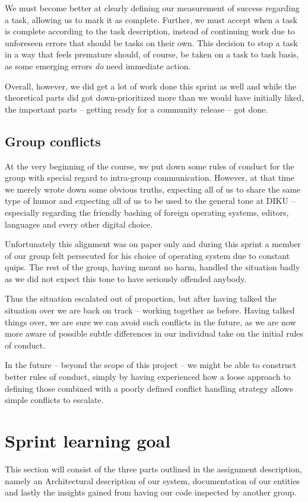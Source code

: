 \documentclass[a4paper]{article}
\begin{document}
We must become better at clearly defining our measurement of success regarding a
task, allowing us to mark it as complete. Further, we must accept when a task is
complete according to the task description, instead of continuing work due to
unforeseen errors that should be tasks on their own. This decision to stop a task
in a way that feels premature should, of course, be taken on a task to task
basis, as some emerging errors \textit{do} need immediate action.

Overall, however, we did get a lot of work done this sprint as well and while the
theoretical parts did got down-prioritized more than we would have initially liked,
the important parts -- getting ready for a community release -- got done.

\subsection{Group conflicts}
At the very beginning of the course, we put down some rules of conduct for the
group with special regard to intra-group communication. However, at that time
we merely wrote down some obvious truths, expecting all of us to share the same
type of humor and expecting all of us to be used to the general tone at DIKU --
especially regarding the friendly bashing of foreign operating systems, editors,
languages and every other digital choice.

Unfortunately this alignment was on paper only and during this sprint a member
of our group felt persecuted for his choice of operating system due to constant
quips. The rest of the group, having meant no harm, handled the situation badly
as we did not expect this tone to have seriously offended anybody.

Thus the situation escalated out of proportion, but after having talked the
situation over we are back on track -- working together as before. Having talked
things over, we are sure we can avoid such conflicts in the future, as we are
now more aware of possible subtle differences in our individual take on the
initial rules of conduct.

In the future -- beyond the scope of this project -- we might be able to construct
better rules of conduct, simply by having experienced how a loose approach to
defining those combined with a poorly defined
conflict handling strategy allows simple conflicts to escalate.

\section{Sprint learning goal}
\label{sec:learning_goals}
This section will consist of the three parts outlined in the assignment
description, namely an Architectural description of our system, documentation
of our entities and lastly the insights gained from having our code inspected
by another group.
\end{document}
